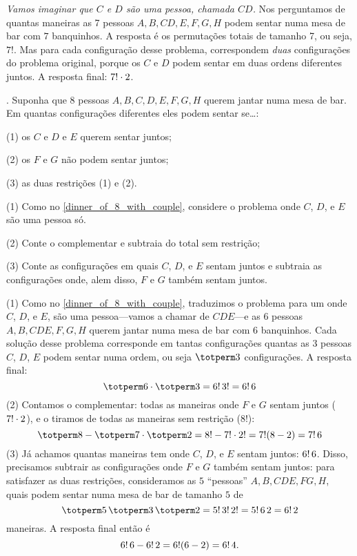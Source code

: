 \solution
\emph{Vamos imaginar que $C$ e $D$ são uma pessoa, chamada $CD$.}
Nos perguntamos de quantas maneiras as 7 pessoas $A,B,CD,E,F,G,H$ podem sentar
numa mesa de bar com $7$ banquinhos.
A resposta é os permutações totais de tamanho 7, ou seja, $7!$.
Mas para cada configuração desse problema,
correspondem \emph{duas} configurações do problema original, porque os
$C$ e $D$ podem sentar em duas ordens diferentes juntos.
A resposta final:
$7! \mathbin{\cdot} 2$.
\endexample

\exercise.
Suponha que 8 pessoas $A,B,C,D,E,F,G,H$ querem jantar numa mesa de bar.
Em quantas configurações diferentes eles podem sentar se\dots:
\item{(1)} os $C$ e $D$ e $E$ querem sentar juntos;
\item{(2)} os $F$ e $G$ não podem sentar juntos;
\item{(3)} as duas restrições (1) e (2).

\hint
\item{(1)} Como no \ref{dinner_of_8_with_couple},
           considere o problema onde $C$, $D$, e $E$ são uma pessoa só.
\item{(2)} Conte o complementar e subtraia do total sem restrição;
\item{(3)} Conte as configurações em quais $C$, $D$, e $E$ sentam juntos e subtraia
           as configurações onde, alem disso, $F$ e $G$ também sentam juntos.

\solution
(1) Como no \ref{dinner_of_8_with_couple}, traduzimos o problema para um onde
$C$, $D$, e $E$, são uma pessoa---vamos a chamar de $CDE$---e as
$6$ pessoas $A,B,CDE,F,G,H$ querem jantar numa mesa de bar com 6 banquinhos.
Cada solução desse problema corresponde em tantas configurações quantas as $3$ pessoas
$C$, $D$, $E$ podem sentar numa ordem, ou seja $\totperm 3$ configurações.
A resposta final:
$$
\totperm 6 \ntimes \totperm 3 = 6!\stimes3! = 6!\stimes 6
$$
\endgraf
(2) Contamos o complementar:
todas as maneiras onde $F$ e $G$ sentam juntos ($7!\mathbin{\cdot} 2$),
e o tiramos de todas as maneiras sem restrição ($8!$):
$$
\totperm 8 - \totperm 7 \ntimes \totperm 2
= 8! - 7!\ntimes 2! = 7!(8 - 2)
= 7!\stimes 6
$$
(3) Já achamos quantas maneiras tem onde $C$, $D$, e $E$ sentam juntos: $6!\,6$.
Disso, precisamos subtrair as configurações onde $F$ e $G$ também sentam juntos:
para satisfazer as duas restrições, consideramos as $5$ ``pessoas''
$A,B,CDE,FG,H$, quais podem sentar numa mesa de bar de tamanho $5$ de
$$
\totperm 5 \stimes \totperm 3 \stimes \totperm 2
= 5! \stimes 3! \stimes 2!
= 5! \stimes 6 \stimes 2
= 6! \stimes 2
$$
maneiras.
A resposta final então é
$$
6!\,6 - 6!\,2 = 6!(6-2) = 6! \, 4.
$$


